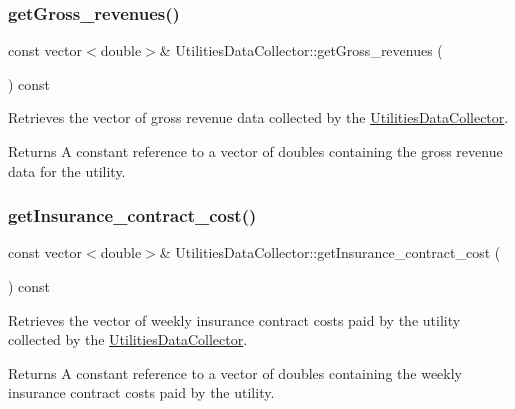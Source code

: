 \subsubsection{\texorpdfstring{get\+Gross\+\_\+revenues()}{getGross\_revenues()}}
{\footnotesize\ttfamily const vector$<$double$>$\& Utilities\+Data\+Collector\+::get\+Gross\+\_\+revenues (\begin{DoxyParamCaption}{ }\end{DoxyParamCaption}) const}



Retrieves the vector of gross revenue data collected by the {\ttfamily \mbox{\hyperlink{classUtilitiesDataCollector}{Utilities\+Data\+Collector}}}. 

\begin{DoxyReturn}{Returns}
A constant reference to a vector of doubles containing the gross revenue data for the utility. 
\end{DoxyReturn}
\mbox{\label{classUtilitiesDataCollector_a96d4541f68916996c0ac74d7d4ad6474}} 
\subsubsection{\texorpdfstring{get\+Insurance\+\_\+contract\+\_\+cost()}{getInsurance\_contract\_cost()}}
{\footnotesize\ttfamily const vector$<$double$>$\& Utilities\+Data\+Collector\+::get\+Insurance\+\_\+contract\+\_\+cost (\begin{DoxyParamCaption}{ }\end{DoxyParamCaption}) const}



Retrieves the vector of weekly insurance contract costs paid by the utility collected by the {\ttfamily \mbox{\hyperlink{classUtilitiesDataCollector}{Utilities\+Data\+Collector}}}. 

\begin{DoxyReturn}{Returns}
A constant reference to a vector of doubles containing the weekly insurance contract costs paid by the utility. 
\end{DoxyReturn}
\mbox{\label{classUtilitiesDataCollector_af7463f468d5aaa3a13bc610660323648}} 
